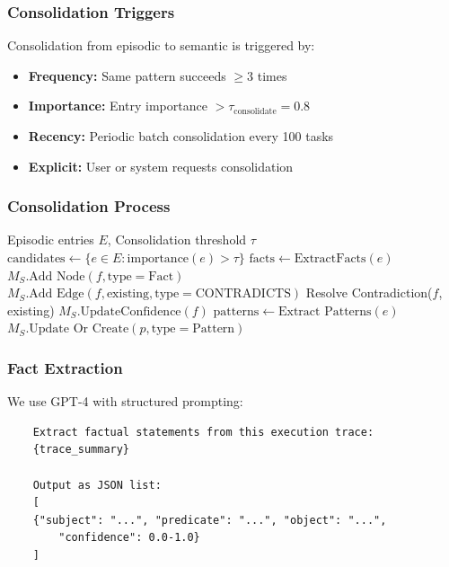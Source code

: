 \documentclass{article}
\theoremstyle{plain}
\theoremstyle{definition}
\theoremstyle{remark}
\begin{document}
\subsubsection{Consolidation Triggers}

Consolidation from episodic to semantic is triggered by:
\begin{itemize}
	\item \textbf{Frequency:} Same pattern succeeds $\geq 3$ times
	\item \textbf{Importance:} Entry importance $> \tau_{\text{consolidate}} = 0.8$
	\item \textbf{Recency:} Periodic batch consolidation every 100 tasks
	\item \textbf{Explicit:} User or system requests consolidation
\end{itemize}

\subsubsection{Consolidation Process}

\begin{algorithm}[H]
	\caption{Episodic-to-Semantic Consolidation}
	\begin{algorithmic}[1]
		\REQUIRE Episodic entries $E$, Consolidation threshold $\tau$
		\STATE $\text{candidates} \leftarrow \{e \in E : \text{importance}(e) > \tau\}$
		\STATE $\text{facts} \leftarrow \text{ExtractFacts}(e)$
		\STATE $M_S.\text{Add Node}(f, \text{type}=\text{Fact})$
		\STATE $M_S.\text{Add Edge}(f, \text{existing}, \text{type}=\text{CONTRADICTS})$
		\STATE Resolve Contradiction($f$, existing)
		\ELSE
		\STATE $M_S.\text{UpdateConfidence}(f)$
		\ENDIF
		\ENDFOR
		\STATE $\text{patterns} \leftarrow \text{Extract Patterns}(e)$
		\STATE $M_S.\text{Update Or Create}(p, \text{type}=\text{Pattern})$
		\ENDFOR
		\ENDFOR
	\end{algorithmic}
\end{algorithm}

\subsubsection{Fact Extraction}

We use GPT-4 with structured prompting:
\begin{verbatim}
	Extract factual statements from this execution trace:
	{trace_summary}
	
	Output as JSON list:
	[
	{"subject": "...", "predicate": "...", "object": "...",
		"confidence": 0.0-1.0}
	]
\end{verbatim}
\end{document}
